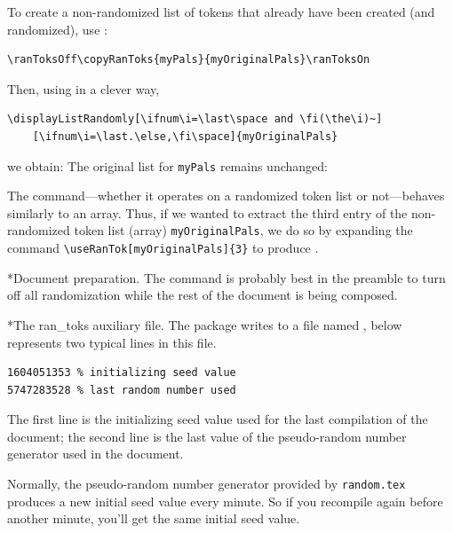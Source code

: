 \documentclass{article}
\makeatletter
\renewcommand{\paragraph}
    {\@startsection{paragraph}{4}{0pt}{6pt}{-3pt}
    {\normalfont\normalsize\bfseries}}
\renewcommand{\subparagraph}
    {\@startsection{subparagraph}{5}{\parindent}{6pt}{-3pt}%
    {\normalfont\normalsize\bfseries}}
\let\amtIndent\leftmargini
\makeatother
\begin{document}
To create a non-randomized list of tokens that already have been created (and randomized), use
:
\begin{Verbatim}[xleftmargin=\amtIndent]
\ranToksOff\copyRanToks{myPals}{myOriginalPals}\ranToksOn
\end{Verbatim}
Then, using  in a clever way,
\begin{Verbatim}[xleftmargin=\amtIndent]
\displayListRandomly[\ifnum\i=\last\space and \fi(\the\i)~]
    [\ifnum\i=\last.\else,\fi\space]{myOriginalPals}
\end{Verbatim}
we obtain: \ranToksOff{}\ranToksOn
{}
The original list for \texttt{myPals} remains unchanged:

The  command---whether it operates on a randomized token list
or not---behaves similarly to an array. Thus, if we wanted to extract
the third entry of the non-randomized token list (array)
\texttt{myOriginalPals}, we do so by expanding the command
\verb!\useRanTok[myOriginalPals]{3}! to produce
.

\subparagraph*{Document preparation.}
The command  is probably best in the preamble to turn off
all randomization while the rest of the document is being composed.

\paragraph*{The \textsf{ran\_toks} auxiliary file.} The package writes to a file named
, below represents two typical lines in this file.
\begin{Verbatim}[xleftmargin=\amtIndent]
1604051353 % initializing seed value
5747283528 % last random number used
\end{Verbatim}
The first line is the initializing seed value used for the last
compilation of the document; the second line is the last value of the
pseudo-random number generator used in the document.

Normally, the pseudo-random number generator provided by
\texttt{random.tex} produces a new initial seed value every minute. So if
you recompile again before another minute, you'll get the same initial
seed value.
\end{document}
